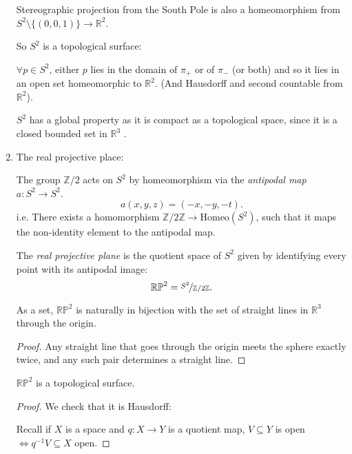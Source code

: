 \begin{example}
\begin{enumerate}
\begin{note}
            Stereographic projection from the South Pole is also a homeomorphism from \(S^2 \setminus \{(0,0,1)\} \to \mathbb{R}^2\). 
        \end{note}
        So \(S^2\) is a topological surface:

        \(\forall p \in S^2\), either \(p\) lies in the domain of \(\pi_+\) or of \(\pi_-\) (or both) and so it lies in an open set homeomorphic to \(\mathbb{R}^2\). (And Hausdorff and second countable from \(\mathbb{R}^2\)).
        \begin{remark}
            \(S^2\) has a global property as it is compact as a topological space, since it is a closed bounded set in \(\mathbb{R}^3\) .
        \end{remark}
        \item The real projective place:
        
        The group \(\mathbb{Z} / 2\) acts on \(S^2\) by homeomorphism via the \textit{antipodal map} \(a: S^2 \to S^2\).
        \[
            a(x,y,z) = (-x,-y,-t).
        \]
        i.e. There exists a homomorphism \(\mathbb{Z} / 2\mathbb{Z} \to  \mathrm{Homeo} (S^2)\), such that it maps the non-identity element to the antipodal map.

        \begin{definition}
            The \textit{real projective plane} is the quotient space of \(S^2\) given by identifying every point with its antipodal image:
            \[
                \mathbb{RP}^2 = \nicefrac{S^2}{\mathbb{Z}/ 2\mathbb{Z}}.
            \]
        \end{definition}

        \begin{lemma}
            As a set, \(\mathbb{RP}^2\) is naturally in bijection with the set of straight lines in \(\mathbb{R}^3\) through the origin.
        \end{lemma}
        \begin{proof}
             Any straight line that goes through the origin meets the sphere exactly twice, and any such pair determines a straight line.
        \end{proof}
        \begin{lemma}
            \(\mathbb{RP}^2\) is a topological surface.
        \end{lemma}
        \begin{proof}
            We check that it is Hausdorff:

            Recall if \(X\) is a space and \(q: X \to Y\) is a quotient map, \(V \subseteq Y\) is open \(\iff q^{-1}V \subseteq X\) open. 


\end{proof}
\end{enumerate}
\end{example}
